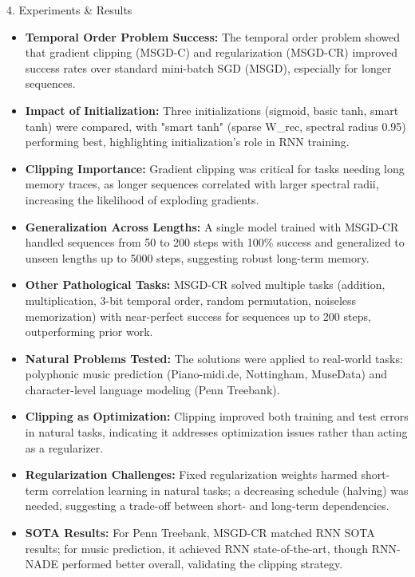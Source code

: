 \documentclass[final]{beamer}
\begin{document}
\begin{frame}[t]
\begin{columns}[t,totalwidth=\textwidth]
\begin{column}{0.35\textwidth}
\begin{block}{4. Experiments \& Results}
\begin{itemize}
    \item \textbf{Temporal Order Problem Success:} The temporal order problem showed that gradient clipping (MSGD-C) and regularization (MSGD-CR) improved success rates over standard mini-batch SGD (MSGD), especially for longer sequences. 

    \item \textbf{Impact of Initialization:} Three initializations (sigmoid, basic tanh, smart tanh) were compared, with "smart tanh" (sparse W\_rec, spectral radius 0.95) performing best, highlighting initialization's role in RNN training. 

    \item \textbf{Clipping Importance:} Gradient clipping was critical for tasks needing long memory traces, as longer sequences correlated with larger spectral radii, increasing the likelihood of exploding gradients. 

    \item \textbf{Generalization Across Lengths:} A single model trained with MSGD-CR handled sequences from 50 to 200 steps with 100\% success and generalized to unseen lengths up to 5000 steps, suggesting robust long-term memory.  

    \item \textbf{Other Pathological Tasks:} MSGD-CR solved multiple tasks (addition, multiplication, 3-bit temporal order, random permutation, noiseless memorization) with near-perfect success for sequences up to 200 steps, outperforming prior work.  

    \item \textbf{Natural Problems Tested:} The solutions were applied to real-world tasks: polyphonic music prediction (Piano-midi.de, Nottingham, MuseData) and character-level language modeling (Penn Treebank).  

    \item \textbf{Clipping as Optimization:} Clipping improved both training and test errors in natural tasks, indicating it addresses optimization issues rather than acting as a regularizer.  

    \item \textbf{Regularization Challenges:} Fixed regularization weights harmed short-term correlation learning in natural tasks; a decreasing schedule (halving) was needed, suggesting a trade-off between short- and long-term dependencies.  

    \item \textbf{SOTA Results:} For Penn Treebank, MSGD-CR matched RNN SOTA results; for music prediction, it achieved RNN state-of-the-art, though RNN-NADE performed better overall, validating the clipping strategy.  


\end{itemize}
\end{block}
\end{column}
\end{columns}
\end{frame}
\end{document}
